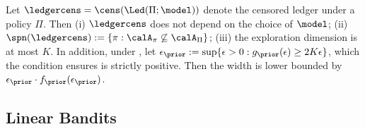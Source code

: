 \begin{lemma}Let $\ledgercens = \cens(\Led(\Pi;\model))$ denote the censored ledger under a policy $\Pi$. Then (i) $\ledgercens$ does not depend on the choice of $\model$; (ii) $\spn(\ledgercens) := \{\pi: \calA_{\pi} \not\subseteq \calA_{\Pi}\}$; (iii) the exploration dimension is at most $K$. In addition, under ,  let $\epsilon_{\prior} := \sup\{\epsilon > 0: \gprior(\epsilon)\ge 2K \epsilon\}$, which the condition ensures is strictly positive.  Then the width is lower bounded by $\epsilon_{\prior} \cdot \fprior(\epsilon_{\prior})$.
\end{lemma}
\begin{comment}
\begin{condition}[Semi-Bandits; First Reward Condition]\label{cond:bandit_first_rew_cond} There exists constants $\epsilon_{\prior},\gamma_{\prior}$ such that
\begin{align*}
\inf_{\Pi} \Pr_{\modvar \sim \prior}\left[ \max_{\pi:\calA_{\pi} \not\subseteq \calA_{\Pi}}\Exp\left[ \sum_{a \in \calA_{\pi}} r_{\modvar}(a) \mid r_{\modvar}[\calA_{\Pi}]\right] - \max_{\pi_0 \in \Pi} \sum_{a \in \calA_{\pi_0}} r_{\modvar}(a)  \ge \epsilon_{\prior}\right] \ge \gamma_{\prior}.
\end{align*}
\end{condition}
\end{comment}



\begin{remark}
\end{remark}


\subsection{Linear Bandits}

